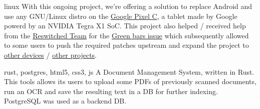 \begin{CV}

    {}
    {linux}
    {With this ongoing project, we're offering a solution to replace Android and use any GNU/Linux distro 
    on the \href{https://en.wikipedia.org/wiki/Pixel_C}{Google Pixel C}, a tablet made by Google powerd by an NVIDIA Tegra X1 SoC.
    This project also helped / received help from the \href{https://reswitched.team/}{Reswitched Team} for the 
    \href{https://github.com/denysvitali/linux-on-pixel-c/issues/1}{Green bars issue} which subsequently allowed to
    some users to push the required patches upstream and expand the project to 
    \href{https://github.com/fail0verflow/switch-linux}{other devices} / 
    \href{https://github.com/postmarketOS/pmbootstrap/pull/1534}{other projects}.}


    

    {}
    {rust, postgres, html5, css3, js}
    {A Document Management System, written in Rust. This tools allows its users to upload some PDFs of previously
    scanned documents, run an OCR and save the resulting text in a DB for further indexing. PostgreSQL was used as a
    backend DB.}




\end{CV}
